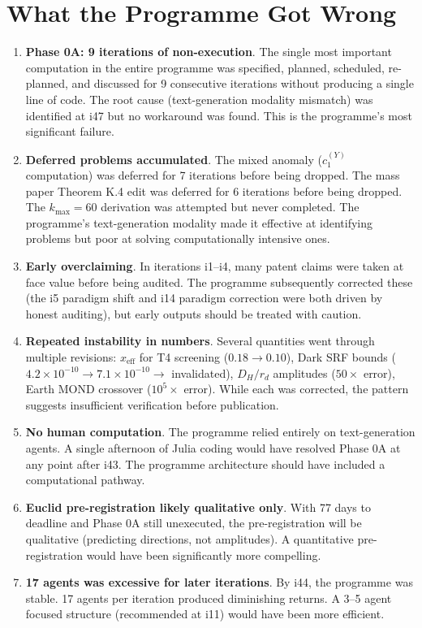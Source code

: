 \documentclass[11pt,a4paper]{article}
\begin{document}
\section{What the Programme Got Wrong}

\begin{enumerate}
\item \textbf{Phase 0A: 9 iterations of non-execution}. The single most important computation in the entire programme was specified, planned, scheduled, re-planned, and discussed for 9 consecutive iterations without producing a single line of code. The root cause (text-generation modality mismatch) was identified at i47 but no workaround was found. This is the programme's most significant failure.

\item \textbf{Deferred problems accumulated}. The mixed anomaly ($c_1^{(Y)}$ computation) was deferred for 7 iterations before being dropped. The mass paper Theorem K.4 edit was deferred for 6 iterations before being dropped. The $k_\text{max} = 60$ derivation was attempted but never completed. The programme's text-generation modality made it effective at identifying problems but poor at solving computationally intensive ones.

\item \textbf{Early overclaiming}. In iterations i1--i4, many patent claims were taken at face value before being audited. The programme subsequently corrected these (the i5 paradigm shift and i14 paradigm correction were both driven by honest auditing), but early outputs should be treated with caution.

\item \textbf{Repeated instability in numbers}. Several quantities went through multiple revisions: $x_\text{eff}$ for T4 screening ($0.18 \to 0.10$), Dark SRF bounds ($4.2 \times 10^{-10} \to 7.1 \times 10^{-10} \to$ invalidated), $D_H/r_d$ amplitudes ($50\times$ error), Earth MOND crossover ($10^5\times$ error). While each was corrected, the pattern suggests insufficient verification before publication.

\item \textbf{No human computation}. The programme relied entirely on text-generation agents. A single afternoon of Julia coding would have resolved Phase 0A at any point after i43. The programme architecture should have included a computational pathway.

\item \textbf{Euclid pre-registration likely qualitative only}. With 77 days to deadline and Phase 0A still unexecuted, the pre-registration will be qualitative (predicting directions, not amplitudes). A quantitative pre-registration would have been significantly more compelling.

\item \textbf{17 agents was excessive for later iterations}. By i44, the programme was stable. 17 agents per iteration produced diminishing returns. A 3--5 agent focused structure (recommended at i11) would have been more efficient.
\end{enumerate}
\end{document}

